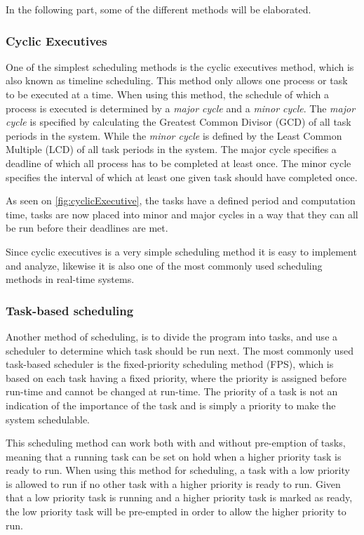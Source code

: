 In the following part, some of the different methods will be elaborated. 

\subsubsection{Cyclic Executives}
One of the simplest scheduling methods is the cyclic executives method, which is also known as timeline scheduling.
This method only allows one process or task to be executed at a time. 
When using this method, the schedule of which a process is executed is determined by a \textit{major cycle} and a \textit{minor cycle}.
The \textit{major cycle} is specified by calculating the Greatest Common Divisor (GCD) of all task periods in the system.
While the \textit{minor cycle} is defined by the Least Common Multiple (LCD) of all task periods in the system. 
The major cycle specifies a deadline of which all process has to be completed at least once.
The minor cycle specifies the interval of which at least one given task should have completed once. 

As seen on \autoref{fig:cyclicExecutive}, the tasks have a defined period and computation time, tasks are now placed into minor and major cycles in a way that they can all be run before their deadlines are met. 

Since cyclic executives is a very simple scheduling method it is easy to implement and analyze, likewise it is also one of the most commonly used scheduling methods in real-time systems\cite{RealTimeEmbeddedSystems}. 

\subsubsection{Task-based scheduling}
Another method of scheduling, is to divide the program into tasks, and use a scheduler to determine which task should be run next.
The most commonly used task-based scheduler is the fixed-priority scheduling method (FPS), which is based on each task having a fixed priority, where the priority is assigned before run-time and cannot be changed at run-time\cite{RealTimeEmbeddedSystems}.
The priority of a task is not an indication of the importance of the task and is simply a priority to make the system schedulable\cite{RealTimeEmbeddedSystems}. 

This scheduling method can work both with and without pre-emption of tasks, meaning that a running task can be set on hold when a higher priority task is ready to run.
When using this method for scheduling, a task with a low priority is allowed to run if no other task with a higher priority is ready to run. 
Given that a low priority task is running and a higher priority task is marked as ready, the low priority task will be pre-empted in order to allow the higher priority to run.


